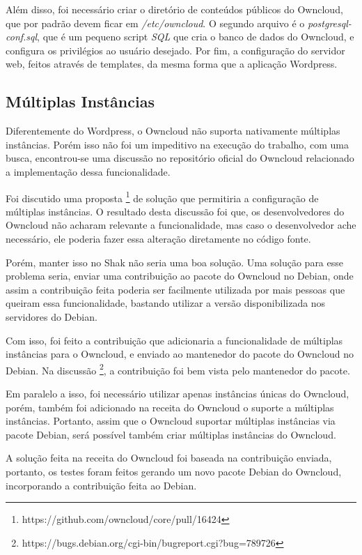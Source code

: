 Além disso, foi necessário criar o diretório de conteúdos públicos do Owncloud, que por
padrão devem ficar em \textit{/etc/owncloud}. O segundo arquivo é o 
\textit{postgresql-conf.sql}, que é um pequeno script \textit{SQL} que cria o 
banco de dados do Owncloud, e configura os
privilégios ao usuário desejado. Por fim, a configuração do servidor web, feitos
através de templates, da mesma forma que a aplicação Wordpress.

\subsection{Múltiplas Instâncias}

Diferentemente do Wordpress, o Owncloud não suporta nativamente múltiplas instâncias. Porém isso
não foi um impeditivo na execução do trabalho, com uma busca, encontrou-se uma 
discussão no repositório oficial do Owncloud relacionado a implementação dessa 
funcionalidade. 


Foi discutido uma proposta \footnote{https://github.com/owncloud/core/pull/16424} 
de solução que permitiria a configuração de múltiplas instâncias. O
resultado desta discussão foi que, os desenvolvedores do Owncloud não acharam relevante
a funcionalidade, mas caso o desenvolvedor ache necessário, ele poderia fazer essa
alteração diretamente no código fonte.

Porém, manter isso no Shak não seria uma boa solução. Uma solução para esse problema seria, 
enviar uma contribuição ao pacote do Owncloud no Debian, onde assim a contribuição feita
poderia ser facilmente utilizada por mais pessoas que queiram essa funcionalidade,
bastando utilizar a versão disponibilizada nos servidores do Debian. 

Com isso, foi feito a contribuição que adicionaria a funcionalidade de múltiplas 
instâncias para o Owncloud, e enviado ao mantenedor do pacote do Owncloud no Debian. 
Na discussão \footnote{https://bugs.debian.org/cgi-bin/bugreport.cgi?bug=789726},
a contribuição foi bem vista pelo mantenedor do pacote.
 
Em paralelo a isso,
foi necessário utilizar apenas instâncias únicas do Owncloud, porém, também foi
adicionado na receita do Owncloud o suporte a múltiplas instâncias. Portanto, 
assim que o Owncloud suportar múltiplas instâncias via pacote Debian, será possível
também criar múltiplas instâncias do Owncloud.

A solução feita na receita do Owncloud foi baseada na contribuição enviada, portanto,
os testes foram feitos gerando um novo pacote Debian do Owncloud, incorporando
a contribuição feita ao Debian. 

